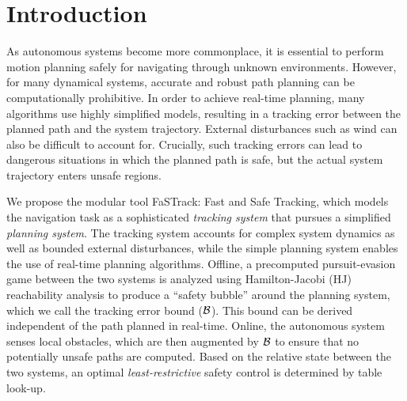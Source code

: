 \section{Introduction}
 As autonomous systems become more commonplace, it is essential to perform motion planning safely for navigating through unknown environments. However, for many dynamical systems, accurate and robust path planning can be computationally prohibitive. In order to achieve real-time planning, many algorithms use highly simplified models, resulting in a tracking error between the planned path and the system trajectory. External disturbances such as wind can also be difficult to account for. Crucially, such tracking errors can lead to dangerous situations in which the planned path is safe, but the actual system trajectory enters unsafe regions.
 


We propose the modular tool FaSTrack: Fast and Safe Tracking, which models the navigation task as a sophisticated \textit{tracking system} that pursues a simplified \textit{planning system}. The tracking system accounts for complex system dynamics as well as bounded external disturbances, while the simple planning system enables the use of real-time planning algorithms. Offline, a precomputed pursuit-evasion game between the two systems is analyzed using Hamilton-Jacobi (HJ) reachability analysis to produce a ``safety bubble'' around the planning system, which we call the tracking error bound ($\mathcal B$). This bound can be derived independent of the path planned in real-time. Online, the autonomous system senses local obstacles, which are then augmented by $\mathcal B$ to ensure that no potentially unsafe paths are computed. Based on the relative state between the two systems, an optimal \textit{least-restrictive} safety control is determined by table look-up. %

